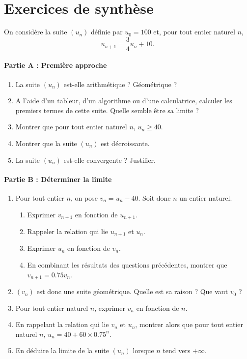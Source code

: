 \documentclass[11pt,fleqn, openany]{book} %
\begin{document}
\section*{Exercices de synthèse}


\begin{exercise}[subtitle={(Suite arithmético-géométrique : découverte guidée)}]

On considère la suite $(u_n)$ définie par $u_0=100$ et, pour tout entier naturel $n$, \[u_{n+1}=\dfrac{3}{4}u_n +10.\]

\paragraph{Partie A : Première approche}
\begin{enumerate}
\item La suite $(u_n)$ est-elle arithmétique ? Géométrique ?
\item A l'aide d'un tableur, d'un algorithme ou d'une calculatrice, calculer les premiers termes de cette suite. Quelle semble être sa limite ?
\item Montrer que pour tout entier naturel $n$, $u_n\geqslant 40$.
\item Montrer que la suite $(u_n)$ est décroissante.
\item La suite $(u_n)$ est-elle convergente ? Justifier.\end{enumerate}

\paragraph{Partie B : Déterminer la limite}
\begin{enumerate}

\item Pour tout entier $n$, on pose $v_n = u_n-40$. Soit donc $n$ un entier naturel.
\begin{enumerate}
\item Exprimer $v_{n+1}$ en fonction de $u_{n+1}$.
\item Rappeler la relation qui lie $u_{n+1}$ et $u_n$.
\item Exprimer $u_n$ en fonction de $v_n$.
\item En combinant les résultats des questions précédentes, montrer que $v_{n+1}=0.75v_n$.
\end{enumerate}
\item $(v_n)$ est donc une suite géométrique. Quelle est sa raison ? Que vaut $v_0$ ?
\item Pour tout entier naturel $n$, exprimer $v_n$ en fonction de $n$.
\item En rappelant la relation qui lie $v_n$ et $u_n$, montrer alors que pour tout entier naturel $n$, $u_n=40+60 \times 0.75^n$.
\item En déduire la limite de la suite $(u_n)$ lorsque $n$ tend vers $+\infty$.
\end{enumerate}\end{exercise}
\end{document}

